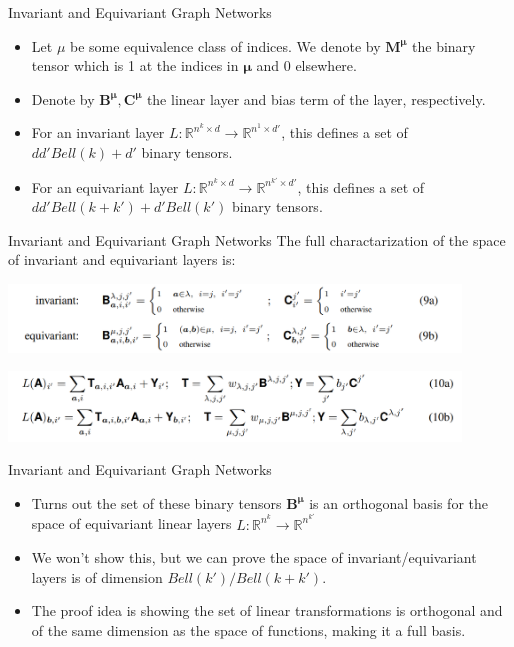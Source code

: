 \documentclass{beamer}
\begin{document}
\begin{frame}{Invariant and Equivariant Graph Networks}
    \begin{itemize}
        \setlength{\itemsep}{\fill}
        \item Let $\mu$ be some equivalence class of indices. We denote by $\mathbf{M}^\mathbf{\mu}$ the binary tensor which is 1 at the indices in $\mathbf{\mu}$ and 0 elsewhere.
        \pause
        \item Denote by $\mathbf{B}^\mathbf{\mu}, \mathbf{C}^\mathbf{\mu}$ the linear layer and bias term of the layer, respectively. 
        \pause
        \item For an invariant layer $L: \mathbb{R}^{n^k \times d} \rightarrow \mathbb{R}^{n^1 \times d'}$, this defines a set of $dd'Bell(k) + d'$ binary tensors.
        \pause
        \item For an equivariant layer $L: \mathbb{R}^{n^k \times d} \rightarrow \mathbb{R}^{n^{k'} \times d'}$, this defines a set of $dd'Bell(k+k') + d'Bell(k')$ binary tensors.
    \end{itemize}
\end{frame}
\begin{frame}{Invariant and Equivariant Graph Networks}
    The full charactarization of the space of invariant and equivariant layers is:
    \begin{center}
        \includegraphics[width=0.9\textwidth]{../figures/layer_gener.png}
    \end{center}
    \begin{center}
        \includegraphics[width=0.9\textwidth]{../figures/full_formulation.png}
    \end{center}
\end{frame}
\begin{frame}{Invariant and Equivariant Graph Networks}
    \begin{itemize}
        \setlength{\itemsep}{\fill}
        \item Turns out the set of these binary tensors $\mathbf{B}^\mathbf{\mu}$ is an orthogonal basis for the space of equivariant linear layers $L: \mathbb{R}^{n^k} \rightarrow \mathbb{R}^{n^{k'}}$
        \pause
        \item We won't show this, but we can prove the space of invariant/equivariant layers is of dimension $Bell(k')/Bell(k + k')$.
        \item The proof idea is showing the set of linear transformations is orthogonal and of the same dimension as the space of functions, making it a full basis.
    \end{itemize}
\end{frame}
\end{document}
